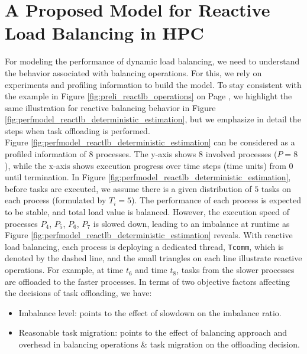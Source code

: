 \section{A Proposed Model for Reactive Load Balancing in HPC}
\label{sec:NewModel-ReactLB}

For modeling the performance of dynamic load balancing, we need to understand the behavior associated with balancing operations. For this, we rely on experiments and profiling information to build the model. To stay consistent with the example in Figure \ref{fig:preli_reactlb_operations} on Page \pageref{fig:preli_reactlb_operations}, we highlight the same illustration for reactive balancing behavior in Figure \ref{fig:perfmodel_reactlb_deterministic_estimation}, but we emphasize in detail the steps when task offloading is performed.\\

Figure \ref{fig:perfmodel_reactlb_deterministic_estimation} can be considered as a profiled information of $8$ processes. The y-axis shows $8$ involved processes ($P = 8$), while the x-axis shows execution progress over time steps (time units) from $0$ until termination. In Figure \ref{fig:perfmodel_reactlb_deterministic_estimation}, before tasks are executed, we assume there is a given distribution of $5$ tasks on each process (formulated by $T_{i} = 5$). The performance of each process is expected to be stable, and total load value is balanced. However, the execution speed of processes $P_{4}$, $P_{5}$, $P_{6}$, $P_{7}$ is slowed down, leading to an imbalance at runtime as Figure \ref{fig:perfmodel_reactlb_deterministic_estimation} reveals. With reactive load balancing, each process is deploying a dedicated thread, \texttt{Tcomm}, which is denoted by the dashed line, and the small triangles on each line illustrate reactive operations. For example, at time $t_{6}$ and time $t_{8}$, tasks from the slower processes are offloaded to the faster processes. In terms of two objective factors affecting the decisions of task offloading, we have:
\begin{itemize}
	\item Imbalance level: points to the effect of slowdown on the imbalance ratio.
	\item Reasonable task migration: points to the effect of balancing approach and overhead in balancing operations \& task migration on the offloading decision.
\end{itemize}


